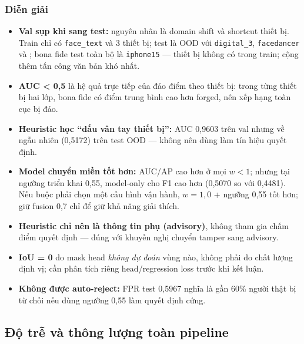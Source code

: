 \documentclass[12pt,a4paper]{article}
\begin{document}
\subsubsection{Diễn giải}
\begin{itemize}
  \item \textbf{Val sụp khi sang test:} nguyên nhân là domain shift và shortcut thiết bị. Train chỉ có
        \texttt{face\_text} và 3 thiết bị; test là OOD với \texttt{digital\_3},
        \texttt{facedancer} và ; bona fide test toàn bộ là
        \texttt{iphone15} --- thiết bị không có trong train; cộng thêm tấn công văn bản khó nhất.
  \item \textbf{AUC < 0,5} là hệ quả trực tiếp của đảo điểm theo thiết bị: trong từng thiết bị hai lớp,
        bona fide có điểm trung bình cao hơn forged, nên xếp hạng toàn cục bị đảo.
  \item \textbf{Heuristic học ``dấu vân tay thiết bị'':} AUC 0,9603 trên val nhưng về ngẫu nhiên
        (0,5172) trên test OOD --- không nên dùng làm tín hiệu quyết định.
  \item \textbf{Model chuyển miền tốt hơn:} AUC/AP cao hơn ở mọi $w<1$; nhưng tại ngưỡng triển khai
        0,55, model-only cho F1 cao hơn (0,5070 so với 0,4481). Nếu buộc phải chọn một cấu hình vận hành,
        $w=1{,}0$ + ngưỡng 0,55 tốt hơn; giữ fusion 0,7 chỉ để giữ khả năng giải thích.
  \item \textbf{Heuristic chỉ nên là thông tin phụ (advisory)}, không tham gia chấm điểm quyết định ---
        đúng với khuyến nghị chuyển tamper sang advisory.
  \item \textbf{IoU = 0} do mask head \emph{không dự đoán} vùng nào, không phải do chất lượng định vị;
        cần phân tích riêng head/regression loss trước khi kết luận.
  \item \textbf{Không được auto-reject:} FPR test 0,5967 nghĩa là gần 60\% người thật bị từ chối nếu
        dùng ngưỡng 0,55 làm quyết định cứng.
\end{itemize}

\subsection{Độ trễ và thông lượng toàn pipeline}
\end{document}
